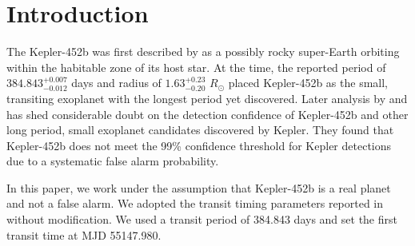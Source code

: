 \documentclass[modern]{aastex631}
\begin{document}

\section{Introduction} \label{sec:intro}

The Kepler-452b was first described by \citet{jenkinsDISCOVERYVALIDATIONKepler452b2015} as a possibly rocky super-Earth orbiting within the habitable zone of its host star. At the time, the reported period of $384.843^{+0.007}_{-0.012}$ days and radius of $1.63^{+0.23}_{-0.20}$ $R_\odot$ placed Kepler-452b as the small, transiting exoplanet with the longest period yet discovered. Later analysis by \citet{mullallyKeplerEarthlikePlanets2018} and \citet{burkeReevaluatingSmallLongperiod2019} has shed considerable doubt on the detection confidence of Kepler-452b and other long period, small exoplanet candidates discovered by Kepler. They found that Kepler-452b does not meet the 99\% confidence threshold for Kepler detections due to a systematic false alarm probability.

In this paper, we work under the assumption that Kepler-452b is a real planet and not a false alarm. We adopted the transit timing parameters reported in  \citet{jenkinsDISCOVERYVALIDATIONKepler452b2015} without modification. We used a transit period of 384.843 days and set the first transit time at MJD 55147.980.
\end{document}
